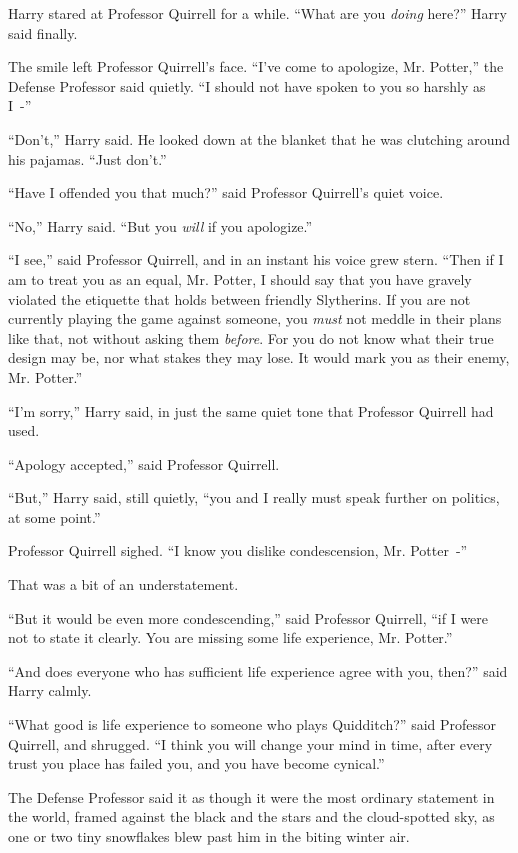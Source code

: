 Harry stared at Professor Quirrell for a while. ``What are you \emph{doing} here?'' Harry said finally.

The smile left Professor Quirrell's face. ``I've come to apologize, Mr. Potter,'' the Defense Professor said quietly. ``I should not have spoken to you so harshly as I~-''

``Don't,'' Harry said. He looked down at the blanket that he was clutching around his pajamas. ``Just don't.''

``Have I offended you that much?'' said Professor Quirrell's quiet voice.

``No,'' Harry said. ``But you \emph{will} if you apologize.''

``I see,'' said Professor Quirrell, and in an instant his voice grew stern. ``Then if I am to treat you as an equal, Mr. Potter, I should say that you have gravely violated the etiquette that holds between friendly Slytherins. If you are not currently playing the game against someone, you \emph{must} not meddle in their plans like that, not without asking them \emph{before}. For you do not know what their true design may be, nor what stakes they may lose. It would mark you as their enemy, Mr. Potter.''

``I'm sorry,'' Harry said, in just the same quiet tone that Professor Quirrell had used.

``Apology accepted,'' said Professor Quirrell.

``But,'' Harry said, still quietly, ``you and I really must speak further on politics, at some point.''

Professor Quirrell sighed. ``I know you dislike condescension, Mr. Potter~-''

That was a bit of an understatement.

``But it would be even more condescending,'' said Professor Quirrell, ``if I were not to state it clearly. You are missing some life experience, Mr. Potter.''

``And does everyone who has sufficient life experience agree with you, then?'' said Harry calmly.

``What good is life experience to someone who plays Quidditch?'' said Professor Quirrell, and shrugged. ``I think you will change your mind in time, after every trust you place has failed you, and you have become cynical.''

The Defense Professor said it as though it were the most ordinary statement in the world, framed against the black and the stars and the cloud-spotted sky, as one or two tiny snowflakes blew past him in the biting winter air.

